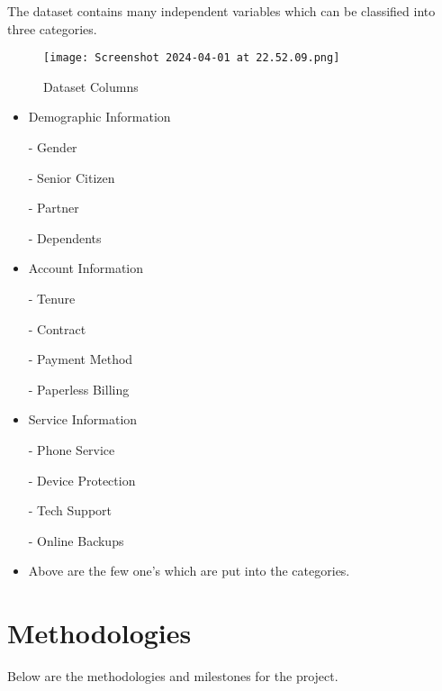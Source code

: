 \documentclass{article}
\begin{document}
The dataset contains many independent variables which can be classified into three categories.
\begin{figure}
    \centering
    \texttt{[image: Screenshot 2024-04-01 at 22.52.09.png]}
    \caption{Dataset Columns}
    \label{fig:enter-label}
\end{figure}
\begin{itemize}
    \item Demographic Information
    
    - Gender

    - Senior Citizen

    - Partner

    - Dependents
    \item Account Information

    - Tenure

    - Contract

    - Payment Method

    - Paperless Billing
    
    \item Service Information

    - Phone Service

    - Device Protection 

    - Tech Support

    - Online Backups

\item Above are the few one's which are put into the categories.
\end{itemize}

\section{Methodologies}
Below are the methodologies and milestones for the project.
\end{document}
